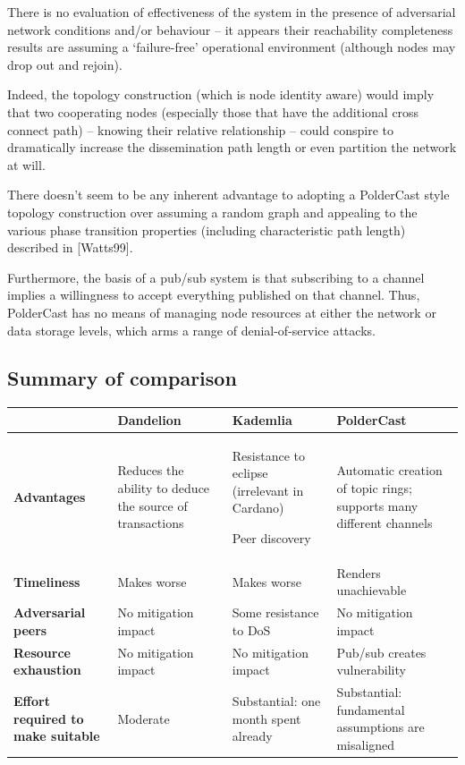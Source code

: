 \documentclass[11pt,a4paper]{article}
\begin{document}
There is no evaluation of effectiveness of the system in the presence of
adversarial network conditions and/or behaviour -- it appears their
reachability completeness results are assuming a `failure-free'
operational environment (although nodes may drop out and rejoin).

Indeed, the topology construction (which is node identity aware) would
imply that two cooperating nodes (especially those that have the
additional cross connect path) -- knowing their relative relationship --
could conspire to dramatically increase the dissemination path length or
even partition the network at will.

There doesn't seem to be any inherent advantage to adopting a PolderCast
style topology construction over assuming a random graph and appealing
to the various phase transition properties (including characteristic
path length) described in {[}Watts99{]}.

Furthermore, the basis of a pub/sub system is that subscribing to a
channel implies a willingness to accept everything published on that
channel. Thus, PolderCast has no means of managing node resources at
either the network or data storage levels, which arms a range of
denial-of-service attacks.

\subsection{Summary of comparison}
\label{summary-of-comparison}

\begin{longtable}[]{@{}llll@{}}
\toprule
& \textbf{Dandelion} & \textbf{Kademlia} &
\textbf{PolderCast}\tabularnewline
\midrule
\endhead
\begin{minipage}[t]{0.22\columnwidth}\raggedright
\textbf{Advantages}\strut
\end{minipage} & \begin{minipage}[t]{0.22\columnwidth}\raggedright
Reduces the ability to deduce the source of transactions\strut
\end{minipage} & \begin{minipage}[t]{0.22\columnwidth}\raggedright
Resistance to eclipse (irrelevant in Cardano)

Peer discovery\strut
\end{minipage} & \begin{minipage}[t]{0.22\columnwidth}\raggedright
Automatic creation of topic rings; supports many different
channels\strut
\end{minipage}\tabularnewline
\textbf{Timeliness} & Makes worse & Makes worse & Renders
unachievable\tabularnewline
\textbf{Adversarial peers} & No mitigation impact & Some resistance to
DoS & No mitigation impact\tabularnewline
\textbf{Resource exhaustion} & No mitigation impact & No mitigation
impact & Pub/sub creates vulnerability\tabularnewline
\textbf{Effort required to make suitable} & Moderate & Substantial: one
month spent already & Substantial: fundamental assumptions are
misaligned\tabularnewline
\bottomrule
\end{longtable}
\end{document}

